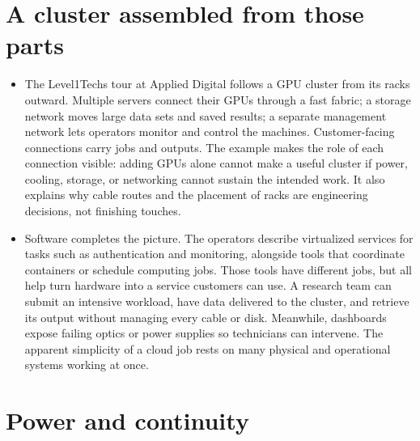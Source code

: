 \documentclass[10pt]{article}
\begin{document}
\section*{A cluster assembled from those parts}

\begin{itemize}[leftmargin=1.25em, itemsep=0.3em, parsep=0pt, topsep=0pt]
    \item The Level1Techs tour at Applied Digital follows a GPU cluster from its racks outward. Multiple servers connect their GPUs through a fast fabric; a storage network moves large data sets and saved results; a separate management network lets operators monitor and control the machines. Customer-facing connections carry jobs and outputs. The example makes the role of each connection visible: adding GPUs alone cannot make a useful cluster if power, cooling, storage, or networking cannot sustain the intended work. It also explains why cable routes and the placement of racks are engineering decisions, not finishing touches.

    \item Software completes the picture. The operators describe virtualized services for tasks such as authentication and monitoring, alongside tools that coordinate containers or schedule computing jobs. Those tools have different jobs, but all help turn hardware into a service customers can use. A research team can submit an intensive workload, have data delivered to the cluster, and retrieve its output without managing every cable or disk. Meanwhile, dashboards expose failing optics or power supplies so technicians can intervene. The apparent simplicity of a cloud job rests on many physical and operational systems working at once.
\end{itemize}

\newpage
\section*{Power and continuity}
\end{document}

